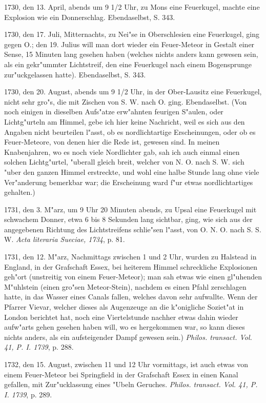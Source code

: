 \documentclass[a4paper, 11pt, oneside, polutonikogreek, german]{article}
\begin{document}
1730, den 13. April, abends um 9 1/2 Uhr, zu Mons eine Feuerkugel, machte eine Explosion wie ein Donnerschlag. Ebendaselbst, S. 343.

1730, den 17. Juli, Mitternachts, zu Nei"se in Oberschlesien eine Feuerkugel, ging gegen O.; den 19. Julius will man dort wieder ein Feuer-Meteor in Gestalt einer Sense, 15 Minuten lang gesehen haben (welches nichts anders kann gewesen sein, als ein gekr"ummter Lichtstreif, den eine Feuerkugel nach einem Bogensprunge zur"uckgelassen hatte). Ebendaselbst, S. 343.

1730, den 20. August, abends um 9 1/2 Uhr, in der Ober-Lausitz eine Feuerkugel, nicht sehr gro"s, die mit Zischen von S. W. nach O. ging. Ebendaselbst. (Von noch einigen in dieselben Aufs"atze erw"ahnten feurigen S"aulen, oder Lichtg"urteln am Himmel, gebe ich hier keine Nachricht, weil es sich aus den Angaben nicht beurteilen l"asst, ob es nordlichtartige Erscheinungen, oder ob es Feuer-Meteore, von denen hier die Rede ist, gewesen sind. In meinen Knabenjahren, wo es noch viele Nordlichter gab, sah ich auch einmal einen solchen Lichtg"urtel, "uberall gleich breit, welcher von N. O. nach S. W. sich "uber den ganzen Himmel erstreckte, und wohl eine halbe Stunde lang ohne viele Ver"anderung bemerkbar war; die Erscheinung ward f"ur etwas nordlichtartiges gehalten.)

1731, den 3. M"arz, um 9 Uhr 20 Minuten abends, zu Upsal eine Feuerkugel mit schwachem Donner, etwa 6 bis 8 Sekunden lang sichtbar, ging, wie sich aus der angegebenen Richtung des Lichtstreifens schlie"sen l"asst, von O. N. O. nach S. S. W. \emph{Acta literaria Sueciae, 1734}, p. 81.

1731, den 12. M"arz, Nachmittags zwischen 1 und 2 Uhr, wurden zu Halstead in England, in der Grafschaft Essex, bei heiterem Himmel schreckliche Explosionen geh"ort (unstreitig von einem Feuer-Meteor); man sah etwas wie einen gl"uhenden M"uhlstein (einen gro"sen Meteor-Stein), nachdem es einen Pfahl zerschlagen hatte, in das Wasser eines Canals fallen, welches davon sehr aufwallte. Wenn der Pfarrer Vievar, welcher dieses als Augenzeuge an die k"onigliche Soziet"at in London berichtet hat, noch eine Viertelstunde nachher etwas dahin wieder aufw"arts gehen gesehen haben will, wo es hergekommen war, so kann dieses nichts anders, als ein aufsteigender Dampf gewesen sein.) \emph{Philos. transact. Vol. 41, P. I. 1739}, p. 288.

1732, den 15. August, zwischen 11 und 12 Uhr vormittags, ist auch etwas von einem Feuer-Meteor bei Springfield in der Grafschaft Essex in einen Kanal gefallen, mit Zur"ucklassung eines "Ubeln Geruches. \emph{Philos. transact. Vol. 41, P. I. 1739}, p. 289.
\end{document}
